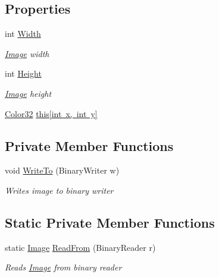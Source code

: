 \subsection*{Properties}
\begin{DoxyCompactItemize}
\item 
int \mbox{\hyperlink{class_virt_muse_web_1_1_utility_1_1_image_aa60d34edebf73095308ca23c31a0024e}{Width}}
\begin{DoxyCompactList}\small\item\em \mbox{\hyperlink{class_virt_muse_web_1_1_utility_1_1_image}{Image}} width \end{DoxyCompactList}\item 
int \mbox{\hyperlink{class_virt_muse_web_1_1_utility_1_1_image_a1640e2f4c3018eda9de31a2ea3a14e4f}{Height}}
\begin{DoxyCompactList}\small\item\em \mbox{\hyperlink{class_virt_muse_web_1_1_utility_1_1_image}{Image}} height \end{DoxyCompactList}\item 
\mbox{\hyperlink{struct_virt_muse_web_1_1_utility_1_1_image_1_1_color32}{Color32}} \mbox{\hyperlink{class_virt_muse_web_1_1_utility_1_1_image_a05a3e3ec4ecba22e4338d2459127abb1}{this\mbox{[}int x, int y\mbox{]}}}
\end{DoxyCompactItemize}
\subsection*{Private Member Functions}
\begin{DoxyCompactItemize}
\item 
void \mbox{\hyperlink{class_virt_muse_web_1_1_utility_1_1_image_aa4740b3d049ec78a42d90c539ee4b186}{Write\+To}} (Binary\+Writer w)
\begin{DoxyCompactList}\small\item\em Writes image to binary writer \end{DoxyCompactList}\end{DoxyCompactItemize}
\subsection*{Static Private Member Functions}
\begin{DoxyCompactItemize}
\item 
static \mbox{\hyperlink{class_virt_muse_web_1_1_utility_1_1_image}{Image}} \mbox{\hyperlink{class_virt_muse_web_1_1_utility_1_1_image_a36723067acdbb5d730ed84bc198ad424}{Read\+From}} (Binary\+Reader r)
\begin{DoxyCompactList}\small\item\em Reads \mbox{\hyperlink{class_virt_muse_web_1_1_utility_1_1_image}{Image}} from binary reader \end{DoxyCompactList}\end{DoxyCompactItemize}
